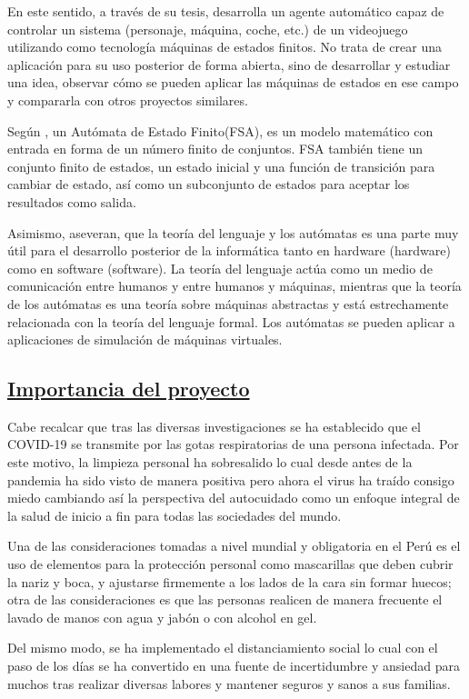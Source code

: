 \documentclass[10pt,conference]{IEEEtran}
\begin{document}
En este sentido,  a través de su tesis, desarrolla un agente automático capaz de controlar un sistema (personaje, máquina, coche, etc.) de un videojuego utilizando como tecnología máquinas de estados finitos. No trata de crear una aplicación para su uso posterior de forma abierta, sino de desarrollar y estudiar una idea, observar cómo se pueden aplicar las máquinas de estados en ese campo y compararla con otros proyectos similares.

Según , un Autómata de Estado Finito(FSA), es un modelo matemático con entrada en forma de un número finito de conjuntos. FSA también tiene un conjunto finito de estados, un estado inicial y una función de transición para cambiar de estado, así como un subconjunto de estados para aceptar los resultados como salida. 

Asimismo,  aseveran, que la teoría del lenguaje y los autómatas es una parte muy útil para el desarrollo posterior de la informática tanto en hardware (hardware) como en software (software). La teoría del lenguaje actúa como un medio de comunicación entre humanos y entre humanos y máquinas, mientras que la teoría de los autómatas es una teoría sobre máquinas abstractas y está estrechamente relacionada con la teoría del lenguaje formal. Los autómatas se pueden aplicar a aplicaciones de simulación de máquinas virtuales.

\subsection{\underline{\textbf{Importancia del proyecto}}}
Cabe recalcar que tras las diversas investigaciones se ha establecido que el COVID-19 se transmite por las gotas respiratorias de una persona infectada. Por este motivo, la limpieza personal ha sobresalido lo cual desde antes de la pandemia ha sido visto de manera positiva pero ahora el virus ha traído consigo miedo cambiando así la perspectiva del autocuidado como un enfoque integral de la salud de inicio a fin para todas las sociedades del mundo.

Una de las consideraciones tomadas a nivel mundial y obligatoria en el Perú es el uso de elementos para la protección personal como mascarillas que deben cubrir la nariz y boca, y ajustarse firmemente a los lados de la cara sin formar huecos; otra de las consideraciones es que las personas realicen de manera frecuente el lavado de manos con agua y jabón o con alcohol en gel.

Del mismo modo, se ha implementado el distanciamiento social lo cual con el paso de los días se ha convertido en una fuente de incertidumbre y ansiedad para muchos tras realizar diversas labores y mantener seguros y sanos a sus familias. 
\end{document}
